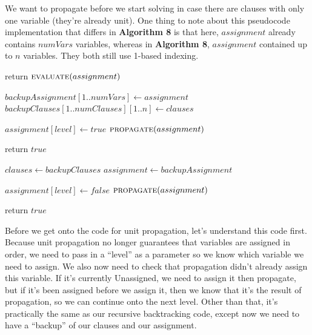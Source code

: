 We want to propagate before we start solving in case there are clauses with 
only one variable (they're already unit). One thing to note about this pseudocode 
implementation that differs in \textbf{Algorithm 8} is that here, $assignment$ 
already contains $numVars$ variables, whereas in \textbf{Algorithm 8}, $assignment$
contained up to $n$ variables. They both still use 1-based indexing.

\begin{algorithm}[H]
\caption{Recursive Solving Method}\label{alg:10}
\begin{algorithmic}[1]


    \State return $\Call{evaluate}{assignment}$
\EndIf

\State $backupAssignment[1..numVars] \gets assignment$
\State $backupClauses[1..numClauses][1..n] \gets clauses$

    \State $assignment[level] \gets true$
    $\Call{propagate}{assignment}$
\EndIf

    \State return $true$
\EndIf

\State $clauses \gets backupClauses$
\State $assignment \gets backupAssignment$

    \State $assignment[level] \gets false$
    $\Call{propagate}{assignment}$
\EndIf

    \State return $true$
\EndIf


\EndProcedure
\end{algorithmic}
\end{algorithm}

Before we get onto the code for unit propagation, let's understand this code first. 
Because unit propagation no longer guarantees that variables are assigned in order, 
we need to pass in a ``level'' as a parameter so we know which variable we need to 
assign. We also now need to check that propagation didn't already assign this variable. 
If it's currently Unassigned, we need to assign it then propagate, but if it's been 
assigned before we assign it, then we know that it's the result of propagation, so we 
can continue onto the next level. Other than that, it's practically the same as our recursive 
backtracking code, except now we need to have a ``backup'' of our clauses and our assignment. 


